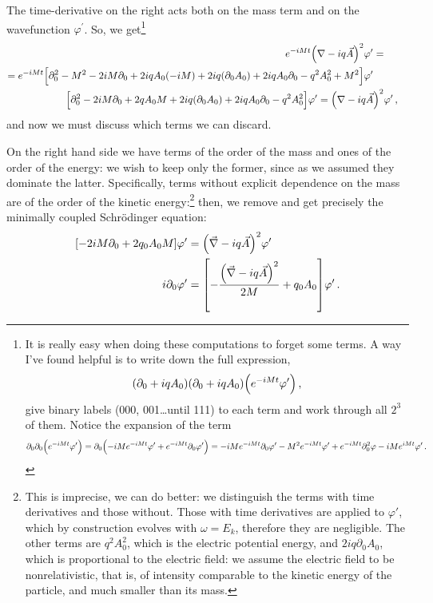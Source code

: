 \documentclass[main.tex]{subfiles}
\begin{document}
The time-derivative on the right acts both on the mass term and on the wavefunction \(\varphi^{\prime }\). So, we get\footnote{It is really easy when doing these computations to forget some terms. A way I've found helpful is to write down the full expression, 
%
\begin{align}
\qty(\partial_0 + i q A_0 )
\qty(\partial_0 + i q A_0 )
\qty(e^{-iMt} \varphi')
\,,
\end{align}
%
give binary labels (000, 001\dots until 111) to each term and work through all \(2^3\) of them. Notice the expansion of the term 
%
\begin{align}
\partial_0 \partial_0 \qty(e^{-iMt} \varphi')
= \partial_0 \qty(-iM e^{-iMt} \varphi' + e^{-iMt} \partial_0 \varphi')
= -iM e^{-iMt} \partial_0 \varphi' 
- M^2 e^{-iMt} \varphi' 
+ e^{-iMt} \partial_0^2 \varphi 
- iM e^{iMt} \varphi' 
\,.
\end{align}
}
%
\begin{align}
\begin{split}
e^{-iMt} \qty(\nabla- iq \vec{A})^2 &\varphi^{\prime } = \\
=e^{-iMt}
\qty[\partial_0^2 - M^2 - 2iM \partial_0  + 2iq A_0 (-iM) + 2 iq \qty(\partial_0 A_0 ) + 2iq A_0 \partial_0 - q^2 A_0^2 + M^2] & \varphi^{\prime }  
\end{split}
\\ 
\qty[\partial_0^2 - 2iM \partial_0  + 2q A_0 M + 2 iq \qty(\partial_0 A_0 ) + 2iq A_0 \partial_0 - q^2 A_0^2 ]
\varphi^{\prime }
=  
\qty(\nabla- iq \vec{A})^2  &\varphi^{\prime }
\,,
\end{align}
%
and now we must discuss which terms we can discard. 

On the right hand side we have terms of the order of the mass and ones of the order of the energy: we wish to keep only the former, since as we assumed they dominate the latter. Specifically, terms without explicit dependence on the mass are of the order of the kinetic energy:\footnote{This is imprecise, we can do better: we distinguish the terms with time derivatives and those without. 
Those with time derivatives are applied to \(\varphi'\), which by construction evolves with \(\omega = E_k\), therefore they are negligible. 
The other terms are \(q^2 A_0^2\), which is the electric potential energy, and  \(2iq \partial_0 A_0 \), which is proportional to the electric field: we assume the electric field to be nonrelativistic, that is, of intensity comparable to the kinetic energy of the particle, and much smaller than its mass.  
}
then, we remove and get precisely the minimally coupled Schrödinger equation:
%
\begin{align}
\qty[- 2 iM \partial_0 + 2 q_0 A_0 M ] \varphi' &= \qty(\vec{\nabla} - iq \vec{A})^2 \varphi^{\prime }  \\
i \partial_0 \varphi' &= \qty[- \frac{ \qty(\vec{\nabla} - i q \vec{A})^2}{2M} + q_0 A_0 ] \varphi'
\,.
\end{align}
%
\end{document}
